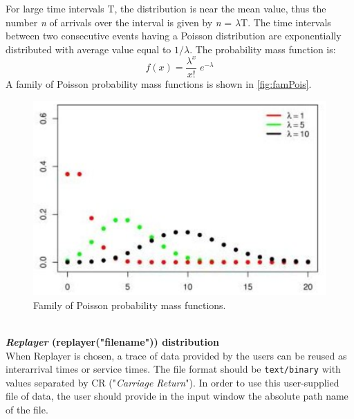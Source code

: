 For large time intervals T, the distribution is near the mean
value, thus the number \emph{n} of arrivals over the interval is
given by \emph{n} = $\lambda$T. The time intervals between two
consecutive events having a Poisson distribution are exponentially
distributed with average value equal to $1/\lambda$. The
probability mass function is:
\[ f(x) = \frac{\lambda^x}{x!} \; e^{-\lambda}
\]
A family of Poisson probability mass functions is shown in
\autoref{fig:famPois}.
\begin{figure}[htb]
    \begin{center}
        \includegraphics[scale=.5]{img/jsimg/4.11.eps}
    \end{center}
    \caption{Family of Poisson probability mass functions.}
    \label{fig:famPois}
\end{figure}\\

\textbf{\emph{Replayer} (replayer("filename")) distribution}\\
When Replayer is chosen, a trace of data provided by the users can
be reused as interarrival times or service times. The file format
should be \texttt{text/binary} with values separated by CR
("\emph{Carriage Return}"). In order to use this user-supplied
file of data, the user should provide in the input window the
absolute path name of the file.\\

